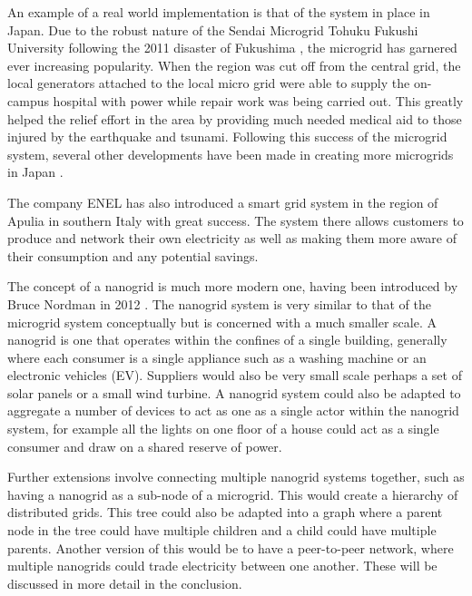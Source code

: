 \documentclass[a4paper, notitlepage]{report}
\begin{document}
An example of a real world implementation is that of the system in place in
Japan. Due to the robust nature of the Sendai Microgrid Tohuku Fukushi
University following the 2011 disaster of Fukushima \cite{hirose2013sendai}, the
microgrid has garnered ever increasing popularity. When the region was cut off
from the central grid, the local generators attached to the local micro grid
were able to supply the on-campus hospital with power while repair work was
being carried out. This greatly helped the relief effort in the area by
providing much needed medical aid to those injured by the earthquake and
tsunami. Following this success of the microgrid system, several other
developments have been made in creating more microgrids in Japan
\cite{japan_microgrids}. 

The company ENEL has also introduced a smart grid system in the region of Apulia
in southern Italy \cite{sapienza2013enel} with great success. The system there
allows customers to produce and network their own electricity as well as making
them more aware of their consumption and any potential savings.

The concept of a nanogrid is much more modern one, having been introduced
by Bruce Nordman in 2012 \cite{nordman2012think}. The nanogrid system is very
similar to that of the microgrid system conceptually but is concerned with a
much smaller scale. A nanogrid is one that operates within the confines of a
single building, generally where each consumer is a single appliance such as a
washing machine or an electronic vehicles (EV). Suppliers would also be very
small scale perhaps a set of solar panels or a small wind turbine. A nanogrid
system could also be adapted to aggregate a number of devices to act as one as a
single actor within the nanogrid system, for example all the lights on one floor
of a house could act as a single consumer and draw on a shared reserve of power.

Further extensions involve connecting multiple nanogrid systems together, such
as having a nanogrid as a sub-node of a microgrid. This would create a hierarchy
of distributed grids. This tree could also be adapted into a graph where a
parent node in the tree could have multiple children and a child could have
multiple parents. Another version of this would be to have a peer-to-peer
network, where multiple nanogrids could trade electricity between one another.
These will be discussed in more detail in the conclusion.
\end{document}
